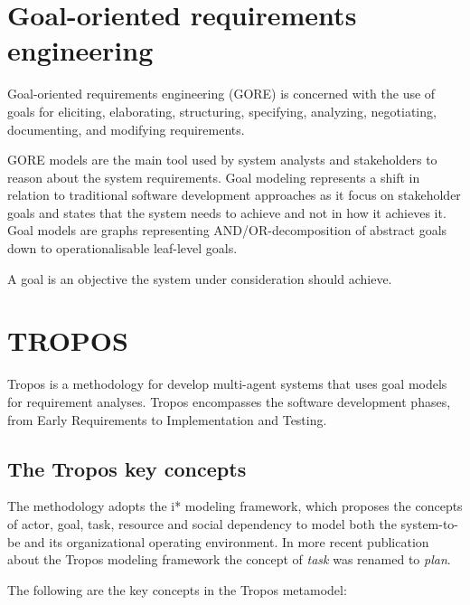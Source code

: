 \section{Goal-oriented requirements engineering}

Goal-oriented requirements engineering (GORE) is concerned with the use of goals for eliciting, elaborating, structuring, specifying, analyzing, negotiating, documenting, and modifying requirements\cite{van_lamsweerde_goal-oriented_2001}.

GORE models are the main tool used by system analysts and stakeholders to reason about the system requirements. Goal modeling represents a shift in relation to traditional software development approaches as it focus on stakeholder goals and states that the system needs to achieve and not in how it achieves it\cite{ali_goal-based_2010}. Goal models are graphs representing AND/OR-decomposition of abstract goals down to operationalisable leaf-level goals. \cite{morandini_operational_2009}

A goal is an objective the system under consideration should achieve. \cite{van_lamsweerde_goal-oriented_2001}

\section{TROPOS}
Tropos\cite{bresciani_tropos:_2004} is a methodology for develop multi-agent systems that uses goal models for requirement analyses. Tropos encompasses the software development phases, from Early Requirements to Implementation and Testing.

\subsection{The Tropos key concepts}

The methodology adopts the i* \cite{yu_modelling_1996} modeling framework, which proposes the concepts of actor, goal, task, resource and social dependency to model both the system-to-be and its organizational operating environment\cite{bresciani_tropos:_2004}. In more recent publication \cite{morandini_tropos_2014} about the Tropos modeling framework the concept of \textit{task} was renamed to \textit{plan}.

The following are the key concepts in the Tropos metamodel\cite{morandini_tropos_2014}:

